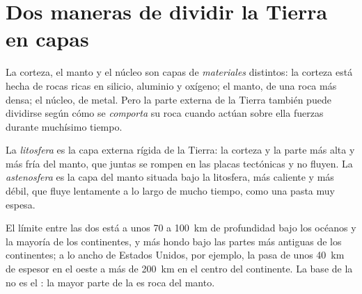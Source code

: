 \section{Dos maneras de dividir la Tierra en capas}

La corteza, el manto y el núcleo son capas de \emph{materiales} distintos: la
corteza está hecha de rocas ricas en silicio, aluminio y oxígeno; el manto, de
una roca más densa; el núcleo, de metal. Pero la parte externa de la Tierra
también puede dividirse según cómo se \emph{comporta} su roca cuando actúan
sobre ella fuerzas durante muchísimo tiempo.

\begin{definition}\label{def:g11:lithosphere-asthenosphere:lithosphere}
La \emph{litosfera} es la capa externa rígida de la Tierra:
la corteza y la parte más alta y más fría del manto, que juntas se rompen en
las placas tectónicas y no fluyen. La
\emph{astenosfera} es la capa del manto situada bajo la
litosfera, más caliente y más débil, que fluye
lentamente a lo largo de mucho tiempo, como una pasta muy espesa.
\end{definition}

El límite entre las dos está a unos 70 a \qty{100}{km} de profundidad bajo los
océanos y la mayoría de los continentes, y más hondo bajo las partes más
antiguas de los continentes; a lo ancho de Estados Unidos, por ejemplo, la
 pasa de unos \qty{40}{km} de espesor en el oeste a más de
\qty{200}{km} en el centro del continente. La base de la  no es el
: la mayor parte de la  es roca del manto.

